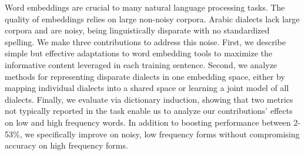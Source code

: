 Word embeddings are crucial to many natural language processing tasks. The quality of embeddings relies on large non-noisy corpora. Arabic dialects lack large corpora and are noisy, being linguistically disparate with no standardized spelling. We make three contributions to address this noise. First, we describe simple but effective adaptations to word embedding tools to maximize the informative content leveraged in each training sentence. Second, we analyze methods for representing disparate dialects in one embedding space, either by mapping individual dialects into a shared space or learning a joint model of all dialects. Finally, we evaluate via dictionary induction, showing that two metrics not typically reported in the task enable us to analyze our contributions' effects on low and high frequency words. In addition to boosting performance between 2-53\%, we specifically improve on noisy, low frequency forms without compromising accuracy on high frequency forms.

